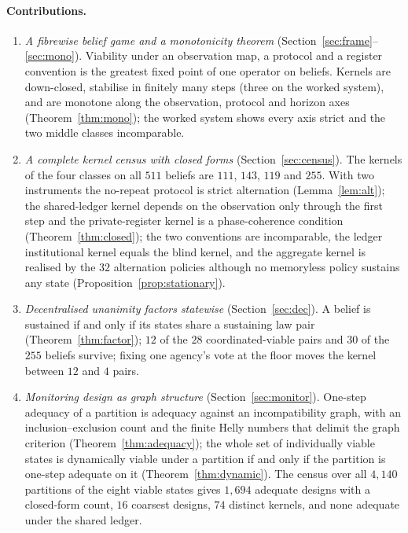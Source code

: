 \documentclass[11pt,a4paper]{article}
\theoremstyle{plain}
\theoremstyle{definition}
\theoremstyle{remark}
\begin{document}
\paragraph{Contributions.}
\begin{enumerate}[leftmargin=2em,itemsep=1pt]
\item \emph{A fibrewise belief game and a monotonicity theorem} (Section~\ref{sec:frame}--\ref{sec:mono}). Viability under an observation map, a protocol and a register convention is the greatest fixed point of one operator on beliefs. Kernels are down-closed, stabilise in finitely many steps (three on the worked system), and are monotone along the observation, protocol and horizon axes (Theorem~\ref{thm:mono}); the worked system shows every axis strict and the two middle classes incomparable.
\item \emph{A complete kernel census with closed forms} (Section~\ref{sec:census}). The kernels of the four classes on all $511$ beliefs are $111$, $143$, $119$ and $255$. With two instruments the no-repeat protocol is strict alternation (Lemma~\ref{lem:alt}); the shared-ledger kernel depends on the observation only through the first step and the private-register kernel is a phase-coherence condition (Theorem~\ref{thm:closed}); the two conventions are incomparable, the ledger institutional kernel equals the blind kernel, and the aggregate kernel is realised by the $32$ alternation policies although no memoryless policy sustains any state (Proposition~\ref{prop:stationary}).
\item \emph{Decentralised unanimity factors statewise} (Section~\ref{sec:dec}). A belief is sustained if and only if its states share a sustaining law pair (Theorem~\ref{thm:factor}); $12$ of the $28$ coordinated-viable pairs and $30$ of the $255$ beliefs survive; fixing one agency's vote at the floor moves the kernel between $12$ and $4$ pairs.
\item \emph{Monitoring design as graph structure} (Section~\ref{sec:monitor}). One-step adequacy of a partition is adequacy against an incompatibility graph, with an inclusion--exclusion count and the finite Helly numbers that delimit the graph criterion (Theorem~\ref{thm:adequacy}); the whole set of individually viable states is dynamically viable under a partition if and only if the partition is one-step adequate on it (Theorem~\ref{thm:dynamic}). The census over all $4{,}140$ partitions of the eight viable states gives $1{,}694$ adequate designs with a closed-form count, $16$ coarsest designs, $74$ distinct kernels, and none adequate under the shared ledger.

\end{enumerate}
\end{document}
